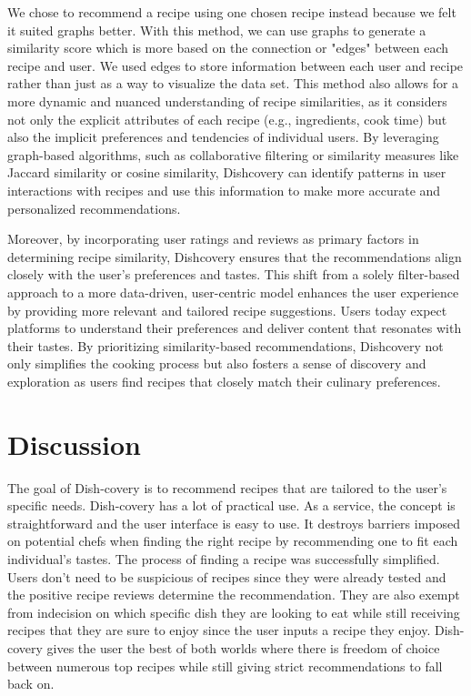 \documentclass[fontsize=11pt]{article}
\begin{document}
We chose to recommend a recipe using one chosen recipe instead because we felt it suited graphs better. With this method, we can use graphs to generate a similarity score which is more based on the connection or "edges" between each recipe and user. We used edges to store information between each user and recipe rather than just as a way to visualize the data set. This method also allows for a more dynamic and nuanced understanding of recipe similarities, as it considers not only the explicit attributes of each recipe (e.g., ingredients, cook time) but also the implicit preferences and tendencies of individual users. By leveraging graph-based algorithms, such as collaborative filtering or similarity measures like Jaccard similarity or cosine similarity, Dishcovery can identify patterns in user interactions with recipes and use this information to make more accurate and personalized recommendations.

Moreover, by incorporating user ratings and reviews as primary factors in determining recipe similarity, Dishcovery ensures that the recommendations align closely with the user's preferences and tastes. This shift from a solely filter-based approach to a more data-driven, user-centric model enhances the user experience by providing more relevant and tailored recipe suggestions. Users today expect platforms to understand their preferences and deliver content that resonates with their tastes. By prioritizing similarity-based recommendations, Dishcovery not only simplifies the cooking process but also fosters a sense of discovery and exploration as users find recipes that closely match their culinary preferences.

\section{Discussion}
The goal of Dish-covery is to recommend recipes that are tailored to the user's specific needs. Dish-covery has a lot of practical use. As a service, the concept is straightforward and the user interface is easy to use. It destroys barriers imposed on potential chefs when finding the right recipe by recommending one to fit each individual's tastes. The process of finding a recipe was successfully simplified. Users don't need to be suspicious of recipes since they were already tested and the positive recipe reviews determine the recommendation. They are also exempt from indecision on which specific dish they are looking to eat while still receiving recipes that they are sure to enjoy since the user inputs a recipe they enjoy. Dish-covery gives the user the best of both worlds where there is freedom of choice between numerous top recipes while still giving strict recommendations to fall back on. 
\end{document}
